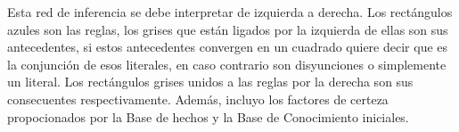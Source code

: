 \begin{center}
\end{center}
\par Esta red de inferencia se debe interpretar de izquierda a derecha.
Los rectángulos azules son las reglas, los grises que están ligados por la izquierda 
de ellas son sus antecedentes, si estos antecedentes convergen en un cuadrado 
quiere decir que es la conjunción de esos literales, en caso contrario son disyunciones
o simplemente un literal. Los rectángulos grises unidos a las reglas por la derecha
son sus consecuentes respectivamente. Además, incluyo los factores de certeza propocionados por
la Base de hechos y la Base de Conocimiento iniciales.

